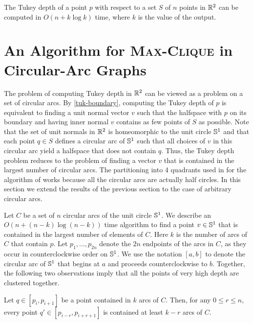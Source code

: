 \documentclass[charterfonts,lotsofwhite]{patmorin}
\begin{document}
\begin{thm}
The Tukey depth of a point $p$ with respect to a set $S$ of $n$ points
in $\mathbb{R}^2$ can be computed in $O(n + k\log k)$ time, where
$k$ is the value of the output.
\end{thm}

\section{An Algorithm for \textsc{Max-Clique} in Circular-Arc Graphs}

The problem of computing Tukey depth in $\mathbb{R}^2$ can be viewed as a
problem on a set of circular arcs.  By \eqref{tuk-boundary}, computing
the Tukey depth of $p$ is equivalent to finding a unit normal vector
$v$ such that the halfspace with $p$ on its boundary and having inner
normal $v$ contains as few points of $S$ as possible.  Note that the
set of unit normals in $\mathbb{R}^2$ is homeomorphic to the unit circle
$\mathbb{S}^1$ and that each point $q\in S$ defines a circular arc of $\mathbb{S}^1$
such that all choices of $v$ in this circular arc yield a halfspace
that does not contain $q$.  Thus, the Tukey depth problem reduces to
the problem of finding a vector $v$ that is contained in the largest
number of circular arcs. The partitioning into 4 quadrants used in for
the algorithm of  works because all the circular arcs are
actually half circles.  In this section we extend the results of the
previous section to the case of arbitrary circular arcs.

Let $C$ be a set of $n$ circular arcs of the unit circle $\mathbb{S}^1$.  We
describe an $O(n+(n-k)\log (n-k))$ time algorithm to find a point
$v\in\mathbb{S}^1$ that is contained in the largest number of elements of
$C$.  Here $k$ is the number of arcs of $C$ that contain $p$.  Let
$p_1,\ldots,p_{2n}$ denote the $2n$ endpoints of the arcs in $C$, as
they occur in counterclockwise order on $\mathbb{S}^1$.  We use the notation
$[a,b]$ to denote the circular arc of $\mathbb{S}^1$ that begins at $a$ and
proceeds counterclockwise to $b$.  Together, the following two
observations imply that all the points of very high depth are
clustered together.

\begin{lem}
Let $q\in[p_i,p_{i+1}]$ be a point contained in $k$ arcs of $C$.
Then, for any $0\le r\le n$, every point $q'\in[p_{i-r},p_{i+r+1}]$ is
contained at least $k-r$ arcs of $C$.
\end{lem}
\end{document}
